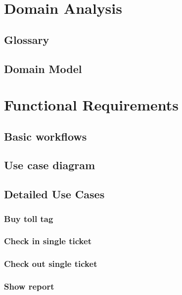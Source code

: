 \section {Domain Analysis}
\subsection{Glossary}


\subsection{Domain Model}


\section{Functional Requirements}
\subsection{Basic workflows}

\subsection{Use case diagram}

\subsection{Detailed Use Cases}
\subsubsection{Buy toll tag} \label{sec:use_case_buy_toll_tag}

\subsubsection{Check in single ticket} \label{sec:use_case_check_in_single_ticket}

\subsubsection{Check out single ticket} \label{sec:use_case_check_out_single_ticket}

\subsubsection{Show report} \label{sec:use_case_show_reports}

